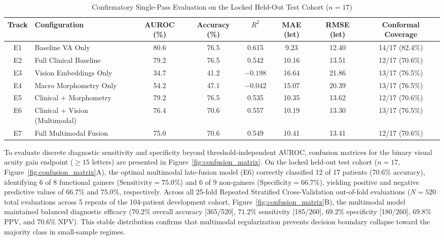 \documentclass[preprint,12pt]{elsarticle}
\begin{document}
\begin{table}[!t]
\centering
\caption{Confirmatory Single-Pass Evaluation on the Locked Held-Out Test Cohort ($n=17$)}
\label{tab:test_results}
\begin{tabular}{clcccccc}
\toprule
\textbf{Track} & \textbf{Configuration} & \textbf{AUROC (\%)} & \textbf{Accuracy (\%)} & \textbf{$R^2$} & \textbf{MAE (let)} & \textbf{RMSE (let)} & \textbf{Conformal Coverage} \\
\midrule
E1 & Baseline VA Only & 80.6 & 76.5 & 0.615 & 9.23 & 12.40 & 14/17 (82.4\%) \\
E2 & Full Clinical Baseline & 79.2 & 76.5 & 0.542 & 10.16 & 13.51 & 12/17 (70.6\%) \\
E3 & Vision Embeddings Only & 34.7 & 41.2 & $-0.198$ & 16.64 & 21.86 & 13/17 (76.5\%) \\
E4 & Macro Morphometry Only & 54.2 & 47.1 & $-0.042$ & 15.07 & 20.39 & 13/17 (76.5\%) \\
E5 & Clinical + Morphometry & 79.2 & 76.5 & 0.535 & 10.35 & 13.62 & 12/17 (70.6\%) \\
E6 & Clinical + Vision (Multimodal) & 76.4 & 70.6 & 0.557 & 10.19 & 13.30 & 13/17 (76.5\%) \\
E7 & Full Multimodal Fusion & 75.0 & 70.6 & 0.549 & 10.41 & 13.41 & 12/17 (70.6\%) \\
\bottomrule
\end{tabular}
\end{table}

To evaluate discrete diagnostic sensitivity and specificity beyond threshold-independent AUROC, confusion matrices for the binary visual acuity gain endpoint ($\ge 15$ letters) are presented in Figure~\ref{fig:confusion_matrix}. On the locked held-out test cohort ($n=17$, Figure~\ref{fig:confusion_matrix}A), the optimal multimodal late-fusion model (E6) correctly classified 12 of 17 patients ($70.6\%$ accuracy), identifying 6 of 8 functional gainers ($\text{Sensitivity} = 75.0\%$) and 6 of 9 non-gainers ($\text{Specificity} = 66.7\%$), yielding positive and negative predictive values of $66.7\%$ and $75.0\%$, respectively. Across all 25-fold Repeated Stratified Cross-Validation out-of-fold evaluations ($N=520$ total evaluations across 5 repeats of the 104-patient development cohort, Figure~\ref{fig:confusion_matrix}B), the multimodal model maintained balanced diagnostic efficacy ($70.2\%$ overall accuracy [365/520], $71.2\%$ sensitivity [185/260], $69.2\%$ specificity [180/260], $69.8\%$ PPV, and $70.6\%$ NPV). This stable distribution confirms that multimodal regularization prevents decision boundary collapse toward the majority class in small-sample regimes.
\end{document}
